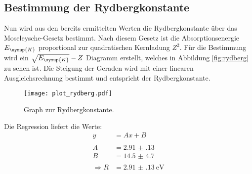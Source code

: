 \subsection{Bestimmung der Rydbergkonstante}

Nun wird aus den bereits ermittelten Werten die Rydbergkonstante über das Moseleysche-Gesetz
bestimmt. Nach diesem Gesetz ist die Absorptionsenergie $E_\symup{K}$ proportional zur
quadratischen Kernladung $Z^2$. Für die Bestimmung wird ein $\sqrt{E_\symup{K}}-Z$ Diagramm
erstellt, welches in Abbildung \eqref{fig:rydberg} zu sehen ist. Die Steigung der Geraden
wird mit einer linearen Ausgleichsrechnung bestimmt und entspricht der Rydbergkonstante.

\begin{figure}[H]
  \centering
  \texttt{[image: plot\_rydberg.pdf]}
  \caption{Graph zur Rydbergkonstante.}
  \label{fig:rydberg}
\end{figure}

Die Regression liefert die Werte:
\begin{align*}
  y &= Ax+B\\\\
  A &= \num{2.91(13)}\\
  B &= \num{14.5(47)}\\\\
  \Rightarrow R &= \SI{2.91(13)}{\eV}
\end{align*}
